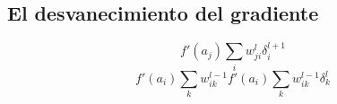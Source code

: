 \subsection{El desvanecimiento del gradiente}
\begin{frame}{\titulo}{\subtitulo}
	\begin{figure}[H]
        \centering
        \scalebox{0.4}{}
    \end{figure}
	$$ f'(a_j) \sum_{i} w_{ji}^{l} \delta_{i}^{l + 1} $$
	$$ f'(a_i) \sum_{k} w_{ik}^{l - 1} f'(a_i) \sum_{k} w_{ik}^{l - 1} \delta_{k}^{l} $$
\end{frame}

\begin{frame}{\titulo}{\subtitulo}
\end{frame}
